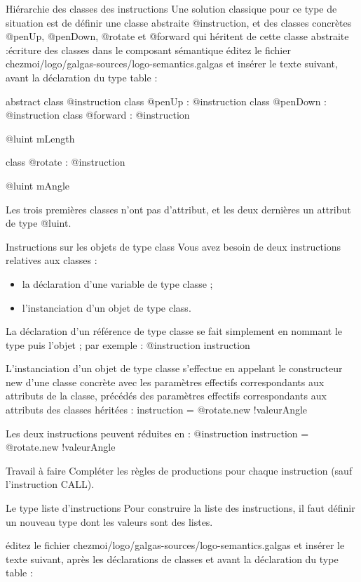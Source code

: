 Hiérarchie des classes des instructions
Une solution classique pour ce type de situation est de définir une classe abstraite @instruction, et des classes concrètes @penUp, @penDown, @rotate et @forward qui héritent de cette classe abstraite :écriture des classes dans le composant sémantique éditez le fichier chezmoi/logo/galgas-sources/logo-semantics.galgas et insérer le texte suivant, avant la déclaration du type table :

\begin{galgascode}
abstract class @instruction {
}
class @penUp : @instruction {
}
class @penDown : @instruction {
}
class @forward : @instruction {

@luint mLength
}
class @rotate : @instruction {

@luint mAngle
}
\end{galgascode}


Les trois premières classes n'ont pas d'attribut, et les deux dernières un attribut de type @luint.

Instructions sur les objets de type class
Vous avez besoin de deux instructions relatives aux classes :
\begin{itemize}
  \item la déclaration d'une variable de type classe ;
  \item l'instanciation d'un objet de type class.
\end{itemize}

La déclaration d'un référence de type classe se fait simplement en nommant le type puis l'objet ; par exemple :
	@instruction instruction

L'instanciation d'un objet de type classe s'effectue en appelant le constructeur new d'une classe concrète avec les paramètres effectifs correspondants aux attributs de la classe, précédés des paramètres effectifs correspondants aux attributs des classes héritées :
	instruction = @rotate.new {!valeurAngle}

Les deux instructions peuvent réduites en :
	@instruction instruction = @rotate.new {!valeurAngle}

Travail à faire
Compléter les règles de productions pour chaque instruction (sauf l'instruction CALL).

Le type liste d'instructions
Pour construire la liste des instructions, il faut définir un nouveau type dont les valeurs sont des listes.

éditez le fichier chezmoi/logo/galgas-sources/logo-semantics.galgas et insérer le texte suivant, après les déclarations de classes et avant la déclaration du type table :

